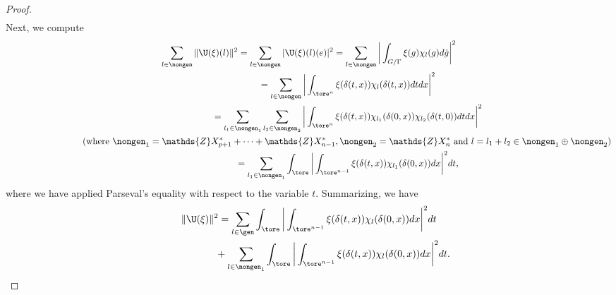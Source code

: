 \begin{proof}
\begin{gather*}
\end{gather*}
Next, we compute
\begin{gather*}
\sum_{l\in
  \nongen}
    \|\U(\xi)(l)\|^2  =
\sum_{l\in \nongen}
    | \U(\xi)(l)(e) |^2  = \sum_{l\in \nongen}\bigg|\int_{G/\Gamma}
    \xi(g) \chi_l(g) d\dot{g} \bigg|^2\\
\hphantom{\sum_{l\in   \nongen}     \|\U(\xi)(l)\|^2}
 = \sum_{l\in \nongen}\bigg|\int_{\tore^{n}}
    \xi(\delta(t, x)) \chi_l(\delta(t, x)
 ) dt dx \bigg|^2\\
\hphantom{\sum_{l\in   \nongen} \|\U(\xi)(l)\|^2}
 = \sum_{l_1\in \nongen_1} \sum_{l_2\in \nongen_2} \bigg|\int_{\tore^{n}}
    \xi(\delta(t, x)) \chi_{l_1}(\delta(0, x))
     \chi_{l_2}(\delta(t, 0) ) dt dx \bigg|^2\\
\hphantom{\sum_{l\in   \nongen} \|\U(\xi)(l)\|^2}
 (\text{where} \ \nongen_1 = \mathds{Z} X_{p+1}^*+\cdots+\mathds{Z}X_{n-1}^*,
     \nongen_2 =\mathds{Z}X_{n}^* \text{ and } l = l_1+l_2
      \in \nongen_1\oplus \nongen_2) \\
\hphantom{\sum_{l\in   \nongen} \|\U(\xi)(l)\|^2}
 = \sum_{l_1\in \nongen_1} \int_{\tore} \bigg|\int_{\tore^{n-1}}
    \xi(\delta(t, x))
 \chi_{l_1}(\delta(0, x))  dx \bigg|^2 dt,
\end{gather*}
where we have applied Parseval's equality with respect to the
variable $t$. Summarizing, we have
\begin{gather*}
  \|\U(\xi)\|^2    =  \sum_{l\in \gen}  \int_{\tore}
 \bigg|
 \int_{\tore^{n-1}} \xi(\delta(t, x))
  \chi_l (\delta(0, x))
 dx  \bigg|^2  dt \\
\hphantom{\|\U(\xi)\|^2    =}{}
+  \sum_{l\in \nongen_1} \int_{\tore}
\bigg|\int_{\tore^{n-1}}
    \xi(\delta(t, x))\chi_{l}(\delta(0, x))
dx \bigg|^2 dt.
\end{gather*}


\end{proof}
